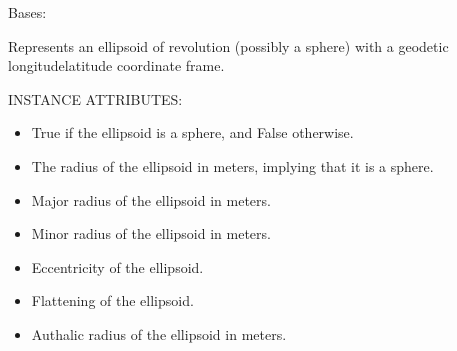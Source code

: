 \documentclass[a4paper,12ptopenany,oneside,english]{sphinxmanual}
\begin{document}
\begin{fulllineitems}
\label{\detokenize{ellipsoids:rhealpixdggs.ellipsoids.Ellipsoid}}
\pysigstartsignatures
{}
\pysigstopsignatures
\sphinxAtStartPar
Bases: 

\sphinxAtStartPar
Represents an ellipsoid of revolution (possibly a sphere) with a
geodetic longitude\sphinxhyphen{}latitude coordinate frame.

\sphinxAtStartPar
INSTANCE ATTRIBUTES:
\begin{itemize}
\item {} 
\sphinxAtStartPar
{} \sphinxhyphen{} True if the ellipsoid is a sphere, and False otherwise.

\item {} 
\sphinxAtStartPar
{} \sphinxhyphen{} The radius of the ellipsoid in meters, implying that it is a
sphere.

\item {} 
\sphinxAtStartPar
{} \sphinxhyphen{} Major radius of the ellipsoid in meters.

\item {} 
\sphinxAtStartPar
{} \sphinxhyphen{} Minor radius of the ellipsoid in meters.

\item {} 
\sphinxAtStartPar
{} \sphinxhyphen{} Eccentricity of the ellipsoid.

\item {} 
\sphinxAtStartPar
{} \sphinxhyphen{} Flattening of the ellipsoid.

\item {} 
\sphinxAtStartPar
{} \sphinxhyphen{} Authalic radius of the ellipsoid in meters.


\end{itemize}
\end{fulllineitems}
\end{document}
